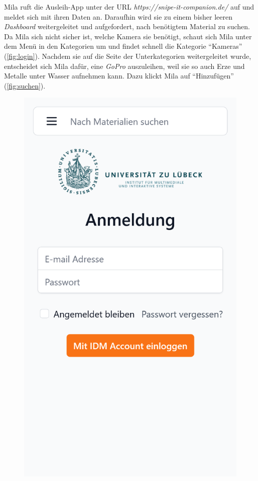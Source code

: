 Mila ruft die Ausleih-App unter der URL \textit{https://snipe-it-companion.de/} auf und meldet sich
mit ihren Daten an. Daraufhin wird sie zu einem bisher leeren \textit{Dashboard} weitergeleitet und
aufgefordert, nach benötigtem Material zu suchen. Da Mila sich nicht sicher ist, welche Kamera sie
benötigt, schaut sich Mila unter dem Menü in den Kategorien um und findet schnell die Kategorie
\enquote{Kameras} (\ref{fig:login}). Nachdem sie auf die Seite der Unterkategorien weitergeleitet
wurde, entscheidet sich Mila dafür, eine \textit{GoPro} auszuleihen, weil sie so auch Erze und
Metalle unter Wasser aufnehmen kann. Dazu klickt Mila auf \enquote{Hinzufügen} (\ref{fig:suchen}).
\begin{figure}[p]
    \centering
    \includegraphics[scale=0.17]{Bilder/Dialgobeispiel/Login.png}\hspace{1em}

\end{figure}
